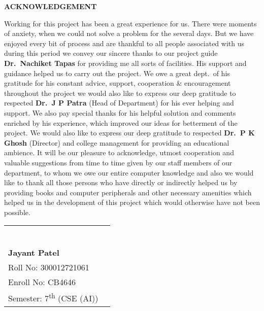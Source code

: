 

\begin{center}
  \Large\textbf{ACKNOWLEDGEMENT}
\end{center}

\begin{justify}
  \linespread{1.5}
  \normalsize 
 Working for this project has been a great experience for us. There were moments of anxiety, when we could not solve a problem for the several days. But we have enjoyed every bit of process and are thankful to all people associated with us during this period we convey our sincere thanks to our project guide \textbf{Dr.\ Nachiket Tapas} for providing me all sorts of facilities. His support and guidance helped us to carry out the project. We owe a great dept.\ of his gratitude for his constant advice, support, cooperation \& encouragement throughout the project we would also like to express our deep gratitude to respected \textbf{Dr.\ J P Patra} (Head of Department) for his ever helping and support. We also pay special thanks for his helpful solution and comments enriched by his experience, which improved our ideas for betterment of the project. We would also like to express our deep gratitude to respected   \textbf{Dr.\ P K Ghosh} (Director) and college management for providing an educational ambience. It will be our pleasure to acknowledge, utmost cooperation and valuable suggestions from time to time given by our staff members of our department, to whom we owe our entire computer knowledge and also we would like to thank all those persons who have directly or indirectly helped us by providing books and computer peripherals and other necessary amenities which helped us in the development of this project which would otherwise have not been possible.
\end{justify}


\vspace{2cm}


\normalsize 

\noindent
\begin{tabular}{p{} @{\hspace{2.4cm}} p{}}
  &
  \centering
  \rule{4cm}{0.4pt} \\
  \textbf{Jayant Patel} \\
  Roll No: 300012721061 \\
  Enroll No: CB4646 \\
  Semester: 7\textsuperscript{th} (CSE (AI)) \\
\end{tabular}
